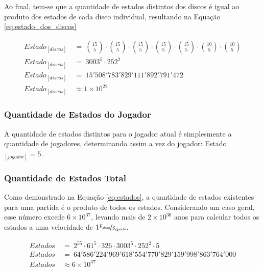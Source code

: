 Ao final, tem-se que a quantidade de estados distintos dos discos é igual ao produto dos estados de cada disco individual, resultando na Equação \ref{eq:estado_dos_discos}

\begin{equation} \label{eq:estado_dos_discos} \tag{e.q. Estado dos discos}
\begin{split}
	Estado_{[discos]}\ &=\ \binom{15}{5}\cdot\binom{15}{5}\cdot\binom{15}{5}\cdot\binom{15}{5}\cdot\binom{15}{5}\cdot\binom{10}{5}\cdot\binom{10}{5}\\
	Estado_{[discos]}\ &=\ 3003^5\cdot252^2\\
	Estado_{[discos]}\ &=\ 15'508'783'829'111'892'791'472\\
	Estado_{[discos]}\ &\approx 1\times 10^{22}
\end{split}
\end{equation}

\subsubsection{Quantidade de Estados do Jogador}

A quantidade de estados distintos para o jogador atual é simplesmente a quantidade de jogadores, determinando assim a vez do jogador: Estado$_{[jogador]}=5$.

\subsubsection{Quantidade de Estados Total}

Como demonstrado na Equação \ref{eq:estados}, a quantidade de estados existentes para uma partida é o produto de todos os estados. Considerando um caso geral, esse número excede $6\times 10^{37}$, levando mais de $2\times 10^{30}$ anos para calcular todos os estados a uma velocidade de $1 \nicefrac{E_{stado}}{S_{egundo}}$.

\begin{equation} \label{eq:estados} \tag{e.q. Caso Geral}
\begin{split}
	Estados\ &=\ 2^{55}\cdot61^{5}\cdot326\cdot3003^{5}\cdot252^{2}\cdot5\\
	Estados\ &=\ 64'586'224'969'618'554'770'829'159'998'863'764'000\\
	Estados\ &\approx 6\times 10^{37}
\end{split}
\end{equation}

